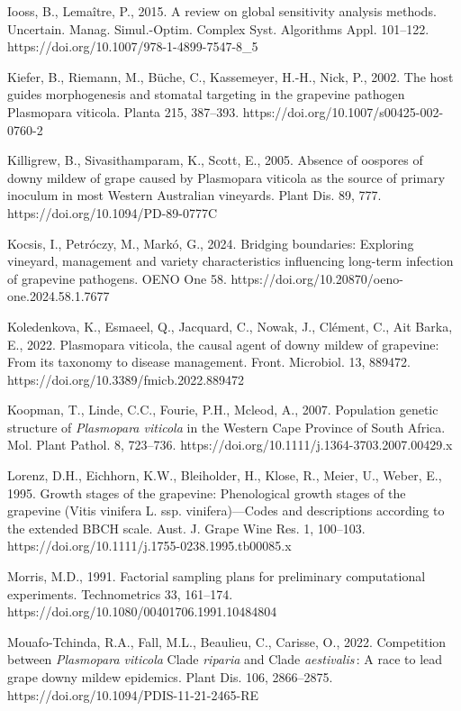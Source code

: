 \documentclass[
]{article}
\begin{document}
Iooss, B., Lemaître, P., 2015. A review on global sensitivity analysis
methods. Uncertain. Manag. Simul.-Optim. Complex Syst. Algorithms Appl.
101--122. https://doi.org/10.1007/978-1-4899-7547-8\_5

Kiefer, B., Riemann, M., Büche, C., Kassemeyer, H.-H., Nick, P., 2002.
The host guides morphogenesis and stomatal targeting in the grapevine
pathogen Plasmopara viticola. Planta 215, 387--393.
https://doi.org/10.1007/s00425-002-0760-2

Killigrew, B., Sivasithamparam, K., Scott, E., 2005. Absence of oospores
of downy mildew of grape caused by Plasmopara viticola as the source of
primary inoculum in most Western Australian vineyards. Plant Dis. 89,
777. https://doi.org/10.1094/PD-89-0777C

Kocsis, I., Petróczy, M., Markó, G., 2024. Bridging boundaries:
Exploring vineyard, management and variety characteristics influencing
long-term infection of grapevine pathogens. OENO One 58.
https://doi.org/10.20870/oeno-one.2024.58.1.7677

Koledenkova, K., Esmaeel, Q., Jacquard, C., Nowak, J., Clément, C., Ait
Barka, E., 2022. Plasmopara viticola, the causal agent of downy mildew of
grapevine: From its taxonomy to disease management. Front. Microbiol.
13, 889472. https://doi.org/10.3389/fmicb.2022.889472

Koopman, T., Linde, C.C., Fourie, P.H., Mcleod, A., 2007. Population
genetic structure of \emph{Plasmopara viticola} in the Western Cape
Province of South Africa. Mol. Plant Pathol. 8, 723--736.
https://doi.org/10.1111/j.1364-3703.2007.00429.x

Lorenz, D.H., Eichhorn, K.W., Bleiholder, H., Klose, R., Meier, U.,
Weber, E., 1995. Growth stages of the grapevine: Phenological growth
stages of the grapevine (Vitis vinifera L. ssp. vinifera)---Codes and
descriptions according to the extended BBCH scale. Aust. J. Grape Wine
Res. 1, 100--103. https://doi.org/10.1111/j.1755-0238.1995.tb00085.x

Morris, M.D., 1991. Factorial sampling plans for preliminary
computational experiments. Technometrics 33, 161--174.
https://doi.org/10.1080/00401706.1991.10484804

Mouafo-Tchinda, R.A., Fall, M.L., Beaulieu, C., Carisse, O., 2022.
Competition between \emph{Plasmopara viticola} Clade \emph{riparia} and
Clade \emph{aestivalis}\,: A race to lead grape downy mildew epidemics.
Plant Dis. 106, 2866--2875. https://doi.org/10.1094/PDIS-11-21-2465-RE
\end{document}
